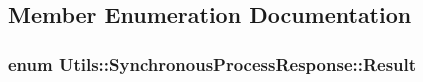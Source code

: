\subsection{\-Member \-Enumeration \-Documentation}
\hypertarget{struct_utils_1_1_synchronous_process_response_aa7b2d882cf93d074f4392e57a6603f2c}{
\subsubsection[{\-Result}]{\setlength{\rightskip}{0pt plus 5cm}enum {\bf \-Utils\-::\-Synchronous\-Process\-Response\-::\-Result}}}\label{struct_utils_1_1_synchronous_process_response_aa7b2d882cf93d074f4392e57a6603f2c}
